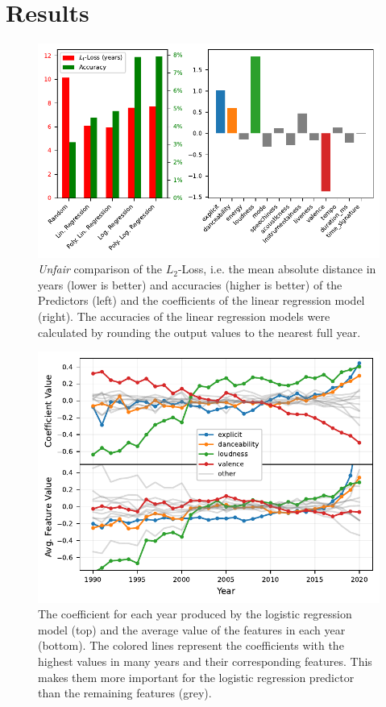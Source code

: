 \documentclass{article}
\begin{document}
\section{Results}
\begin{figure}[t]
  \centering
  \includegraphics{losses_lincoefs}
  \caption{\emph{Unfair} comparison of the $L_2$-Loss, i.e.  the mean absolute distance in years (lower is better) and accuracies (higher is better) of the Predictors (left) and the coefficients of the linear regression model (right). The accuracies of the linear regression models were calculated by rounding the output values to the nearest full year.}
  \label{fig:losses_lincoefs}
\end{figure}

\begin{figure}[t]
  \centering
  \includegraphics{coefs_avg}
  \caption{The coefficient for each year produced by the logistic regression model (top) and the average value of the features in each year (bottom). The colored lines represent the coefficients with the highest values in many years and their corresponding features. This makes them more important for the logistic regression predictor than the remaining features (grey).} 
  \label{fig:coefs_avg}
\end{figure}
\end{document}
